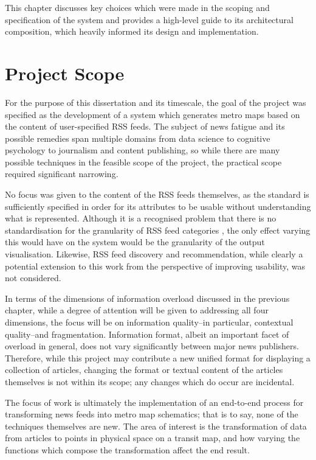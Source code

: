 This chapter discusses key choices which were made in the scoping and specification of the system and provides a high-level guide to its architectural composition, which heavily informed its design and implementation.

\section{Project Scope}

For the purpose of this dissertation and its timescale, the goal of the project was specified as the development of a system which generates metro maps based on the content of user-specified RSS feeds. The subject of news fatigue and its possible remedies span multiple domains from data science to cognitive psychology to journalism and content publishing, so while there are many possible techniques in the feasible scope of the project, the practical scope required significant narrowing.

No focus was given to the content of the RSS feeds themselves, as the standard is sufficiently specified in order for its attributes to be usable without understanding what is represented. Although it is a recognised problem that there is no standardisation for the granularity of RSS feed categories \citep{PersonalNewsRss}, the only effect varying this would have on the system would be the granularity of the output visualisation. Likewise, RSS feed discovery and recommendation, while clearly a potential extension to this work from the perspective of improving usability, was not considered.

In terms of the dimensions of information overload \citep{TowardsAnOptimalResolutionToInformationOverload} discussed in the previous chapter, while a degree of attention will be given to addressing all four dimensions, the focus will be on information quality--in particular, contextual quality--and fragmentation. Information format, albeit an important facet of overload in general, does not vary significantly between major news publishers. Therefore, while this project may contribute a new unified format for displaying a collection of articles, changing the format or textual content of the articles themselves is not within its scope; any changes which do occur are incidental.

The focus of work is ultimately the implementation of an end-to-end process for transforming news feeds into metro map schematics; that is to say, none of the techniques themselves are new. The area of interest is the transformation of data from articles to points in physical space on a transit map, and how varying the functions which compose the transformation affect the end result.

